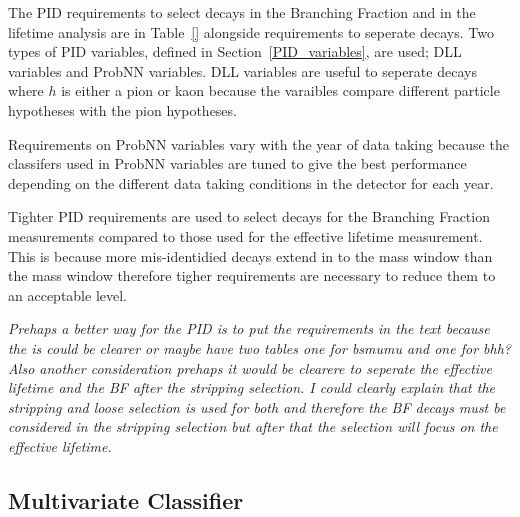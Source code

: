 The PID requirements to select \bmumu decays in the Branching Fraction and \bsmumu in the lifetime analysis are in Table~\ref{} alongside requirements to seperate \bhh decays. Two types of PID variables, defined in Section~\ref{PID_variables}, are used; DLL variables and ProbNN variables. DLL variables are useful to seperate \bhh decays where $h$ is either a pion or kaon because the varaibles compare different particle hypotheses with the pion hypotheses.

Requirements on ProbNN variables vary with the year of data taking because the classifers used in ProbNN variables are tuned to give the best performance depending on the different data taking conditions in the detector for each year. %

Tighter PID requirements are used to select \bmumu decays for the Branching Fraction measurements compared to those used for the effective lifetime measurement. This is because more mis-identidied decays extend in to the \bd mass window than the \bs mass window therefore tigher requirements are necessary to reduce them to an acceptable level. %

{\it Prehaps a better way for the PID is to put the requirements in the text because the is could be clearer or maybe have two tables one for bsmumu and one for bhh? Also another consideration prehaps it would be clearere to seperate the effective lifetime and the BF after the stripping selection. I could clearly explain that the stripping and loose selection is used for both and therefore the BF decays must be considered in the stripping selection but after that the selection will focus on the effective lifetime. }


\subsection{Multivariate Classifier}
\label{sec:BDT}
